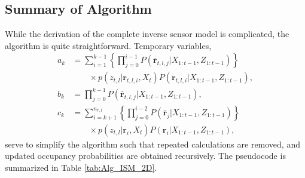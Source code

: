 \documentclass[letterpaper, 10pt, conference]{ieeeconf}
\begin{document}
\subsection{Summary of Algorithm}

While the derivation of the complete inverse sensor model is complicated, the algorithm is quite straightforward.
Temporary variables,
\begin{align*}
a_k&=\sum_{i=1}^{k-1}\left\{\prod_{j=0}^{i-1}P(\bar{\mathbf{r}}_{t,l,j}|X_{1:t-1},Z_{1:t-1})\right\}\nonumber\\&\quad\quad\times p(z_{t,l}|\mathbf{r}_{t,l,i},X_t)P(\mathbf{r}_{t,l,i}|X_{1:t-1},Z_{1:t-1}),
\\
b_k&=\prod_{j=0}^{k-1}P(\bar{\mathbf{r}}_{t,l,j}|X_{1:t-1},Z_{1:t-1}),
\nonumber\\
c_k&=\sum_{i=k+1}^{n_{r,l}}\left\{\prod_{j=0}^{i-2}P(\bar{\mathbf{r}}_j|X_{1:t-1},Z_{1:t-1})\right\}\nonumber\\&\quad\quad\times p(z_{t,l}|\mathbf{r}_i,X_t)P(\mathbf{r}_i|X_{1:t-1},Z_{1:t-1}),
\end{align*}
serve to simplify the algorithm such that repeated calculations are removed, and updated occupancy probabilities are obtained recursively.
The pseudocode is summarized in Table \ref{tab:Alg_ISM_2D}.
\end{document}
